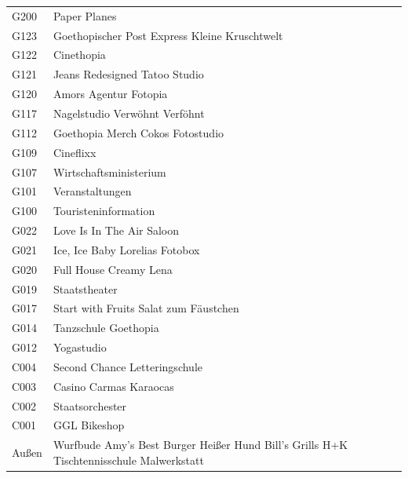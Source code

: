 \documentclass[12pt]{article}
\begin{document}
\begin{minipage}{.28\textwidth}
    \begin{framed}
        \begin{tabular}{p{1cm}p{5cm}}
            G200 & Paper Planes\\
            G123 & Goethopischer Post Express \newline Kleine Kruschtwelt\\
            G122 & Cinethopia \\
            G121 & Jeans Redesigned \newline Tatoo Studio \\
            G120 & Amors Agentur \newline Fotopia \\
            G117 & Nagelstudio \newline Verwöhnt Verföhnt \\
            G112 & Goethopia Merch \newline Cokos Fotostudio \\
            G109 & Cineflixx \\
            G107 & Wirtschaftsministerium\\
            G101 & Veranstaltungen \\
            G100 & Touristeninformation\\
            G022 & Love Is In The Air \newline Saloon\\
            G021 & Ice, Ice Baby \newline Lorelias Fotobox \\
            G020 & Full House \newline Creamy Lena \\
            G019 & Staatstheater \\
            G017 & Start with Fruits \newline Salat zum Fäustchen \\
            G014 & Tanzschule Goethopia \\
            G012 & Yogastudio \\
            C004 & Second Chance \newline Letteringschule \\
            C003 & Casino \newline Carmas Karaocas \\
            C002 & Staatsorchester \\
            C001 & GGL Bikeshop \\
            Außen & Wurfbude \newline Amy's Best Burger \newline Heißer Hund \newline Bill's Grills
            \newline H+K Tischtennisschule \newline Malwerkstatt\\
        \end{tabular}
    \end{framed}
\end{minipage}
\end{document}
